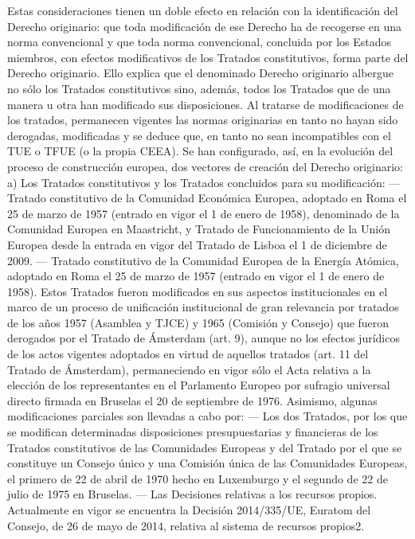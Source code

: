 \documentclass[10pt,a4paper]{article}
\begin{document}
Estas consideraciones tienen un doble efecto en relación con la identificación del Derecho originario: que toda modificación de ese Derecho ha de recogerse en una norma convencional y que toda norma convencional, concluida por los Estados miembros, con efectos modificativos de los Tratados constitutivos, forma parte del Derecho originario. Ello explica que el denominado Derecho originario albergue no sólo los Tratados constitutivos sino, además, todos los Tratados que de una manera u otra han modificado sus disposiciones. Al tratarse de modificaciones de los tratados, permanecen vigentes las normas originarias en tanto no hayan sido derogadas, modificadas y se deduce que, en tanto no sean incompatibles con el TUE o TFUE (o la propia CEEA). Se han configurado, así, en la evolución del proceso de construcción europea, dos vectores de creación del Derecho originario:
a) Los Tratados constitutivos y los Tratados concluidos para su modificación:
— Tratado constitutivo de la Comunidad Económica Europea, adoptado en Roma el 25 de marzo de 1957 (entrado en vigor el 1 de enero de 1958), denominado de la Comunidad Europea en Maastricht, y Tratado de Funcionamiento de la Unión Europea desde la entrada en vigor del Tratado de Lisboa el 1 de diciembre de 2009.
— Tratado constitutivo de la Comunidad Europea de la Energía Atómica, adoptado en Roma el 25 de marzo de 1957 (entrado en vigor el 1 de enero de 1958).
Estos Tratados fueron modificados en sus aspectos institucionales en el marco de un proceso de unificación institucional de gran relevancia por tratados de los años 1957 (Asamblea y TJCE) y 1965 (Comisión y Consejo) que fueron derogados por el Tratado de Ámsterdam (art. 9), aunque no los efectos jurídicos de los actos vigentes adoptados en virtud de aquellos tratados (art. 11 del Tratado de Ámsterdam), permaneciendo en vigor sólo el Acta relativa a la elección de los representantes en el Parlamento Europeo por sufragio universal directo firmada en Bruselas el 20 de septiembre de 1976.
Asimismo, algunas modificaciones parciales son llevadas a cabo por:
— Los dos Tratados, por los que se modifican determinadas disposiciones presupuestarias y financieras de los Tratados constitutivos de las Comunidades Europeas y del Tratado por el que se constituye un Consejo único y una Comisión única de las Comunidades Europeas, el primero de 22 de abril de 1970 hecho en Luxemburgo y el segundo de 22 de julio de 1975 en Bruselas.
— Las Decisiones relativas a los recursos propios. Actualmente en vigor se encuentra la Decisión 2014/335/UE, Euratom del Consejo, de 26 de mayo de 2014, relativa al sistema de recursos propios2.
\end{document}
